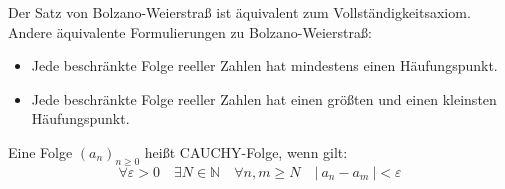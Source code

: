 \documentclass[a4paper,titlepage,oneside]{article}
\def\N{\ensuremath{\mathbb{N}} }
\renewcommand{\epsilon}{\ensuremath{\varepsilon} }
\newcommand{\abs}[1]{\ensuremath{\left|\:#1\:\right|}}
\theoremstyle{thmstyle}
\begin{document}
\begin{subbem}
Der Satz von Bolzano-Weierstraß ist äquivalent zum Vollständigkeitsaxiom. Andere äquivalente Formulierungen zu Bolzano-Weierstraß:
\begin{itemize}
\item Jede beschränkte Folge reeller Zahlen hat mindestens einen Häufungspunkt.
\item Jede beschränkte Folge reeller Zahlen hat einen größten und einen kleinsten Häufungspunkt.
\end{itemize}
\end{subbem}

\begin{subdefi}
Eine Folge \((a_n)_{n \ge 0}\) heißt CAUCHY-Folge, wenn gilt:
\[\forall \epsilon > 0 \quad \exists N \in \N \quad \forall n, m \ge N \quad \abs{a_n - a_m} < \epsilon\]
\end{subdefi}
\end{document}

